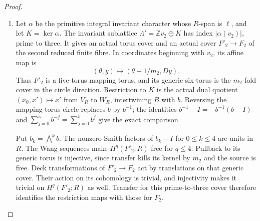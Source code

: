 \documentclass[11pt,a4paper]{article}
\theoremstyle{definition}
\begin{document}
\begin{proof}
\begin{enumerate}[label=\arabic*.]
The base-orbifold quotient in \cref{maps:src:F.2.7} shows that
$\gcd(m_1,m_2)=1$.  In particular $m_1$ is a unit in $R$.
The homology augmentation matrix $[A^t-I\mid B^t-I]$ has first
row zero and rank-five minors $-4$ and $-1$ in its last five
rows, respectively.  Its coinvariant quotient over $R$ is
therefore $R$ through $\ell(x)=x_0$.  With $a_i=\ell(v_i)$,
the finite power relations and cusp clutch give the quotient
relation matrix
\[
 \begin{pmatrix}m_1&0&-a_1\\0&m_2&-a_2\\1&1&-\delta\end{pmatrix}.
\]
Here $\delta$ is the character value of the actual cusp clutch.
The character annihilates the collapsed angular cycles, so these
maps on the finite caps and cusp agree on the boundary and define
a quotient of the abelianized fundamental group.  Simple
connectivity makes its determinant a unit.  Reduction modulo
three forces $a_2$ to be a unit.  Arbitrary clutch translations
are included in $\delta$.

\item Let $\alpha$ be the primitive integral invariant character
whose $R$-span is $\ell$, and let $K=\ker\alpha$.  The invariant
sublattice $\Lambda'=\mathbb Zv_2\oplus K$ has index
$|\alpha(v_2)|$, prime to three.  It gives an actual torus cover
and an actual cover $F'_2\to F_2$ of the second reduced finite
fibre.  In coordinates beginning with $v_2$, its affine map is
\[
 (\theta,y)\longmapsto(\theta+1/m_2,Dy).
\]
Thus $F'_2$ is a five-torus mapping torus, and its generic
six-torus is the $m_2$-fold cover in the circle direction.
Restriction to $K$ is the actual dual quotient
$(x_0,x')\mapsto x'$ from $V_R$ to $W_R$, intertwining $B$ with $b$.
Reversing the mapping-torus circle replaces $b$ by $b^{-1}$;
the identities $b^{-1}-I=-b^{-1}(b-I)$ and
$\sum_{j=0}^5b^{-j}=\sum_{j=0}^5b^j$ give the exact comparison.

Put $b_k=\bigwedge^kb$.  The nonzero Smith factors of $b_k-I$
for $0\leq k\leq4$ are units in $R$.  The Wang sequences make
$H^q(F'_2;R)$ free for $q\leq4$.  Pullback to its generic torus
is injective, since transfer kills its kernel by $m_2$ and the
source is free.  Deck transformations of $F'_2\to F_2$ act by
translations on that generic cover.  Their action on its
cohomology is trivial, and injectivity makes it trivial on
$H^q(F'_2;R)$ as well.  Transfer for this prime-to-three cover
therefore identifies the restriction maps with those for $F_2$.


\end{enumerate}
\end{proof}
\end{document}
